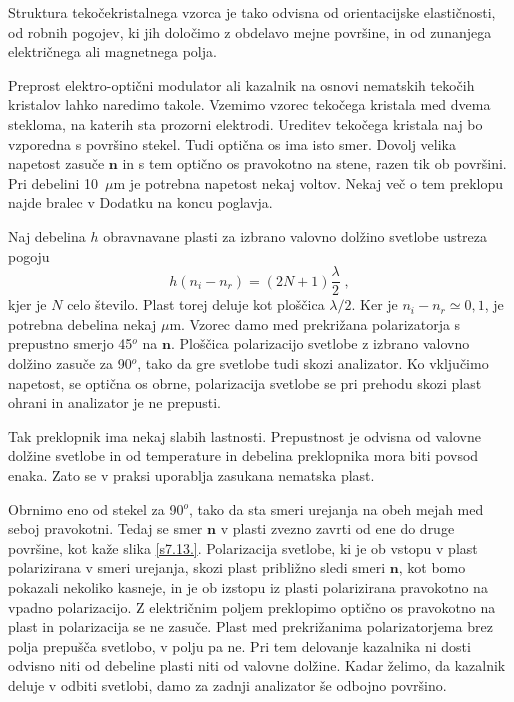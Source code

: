 Struktura tekočekristalnega vzorca je tako odvisna od orientacijske
elastičnosti, od robnih pogojev, ki jih določimo z obdelavo mejne
površine, in od zunanjega električnega ali magnetnega polja.

Preprost elektro-optični modulator ali kazalnik na osnovi nematskih
tekočih kristalov lahko naredimo takole. Vzemimo vzorec tekočega kristala
med dvema stekloma, na katerih sta prozorni elektrodi. Ureditev tekočega
kristala naj bo vzporedna s površino stekel. Tudi optična os ima isto
smer. Dovolj velika napetost zasuče $\mathbf{n}$ in s tem optično os
pravokotno na stene, razen tik ob površini. Pri debelini 10~$\mu$m
je potrebna napetost nekaj voltov. Nekaj več o tem preklopu najde
bralec v Dodatku na koncu poglavja.

Naj debelina $h$ obravnavane plasti za izbrano valovno dolžino svetlobe
ustreza pogoju 
\begin{equation}
h(n_{i}-n_{r})=(2N+1)\frac{\lambda}{2}\;,\label{7.57}
\end{equation}
 kjer je $N$ celo število. Plast torej deluje kot ploščica $\lambda/2$.
Ker je $n_{i}-n_{r}\simeq0,1$, je potrebna debelina nekaj $\mu$m.
Vzorec damo med prekrižana polarizatorja s prepustno smerjo 45$^{o}$
na $\mathbf{n}$. Ploščica polarizacijo svetlobe z izbrano valovno dolžino
zasuče za 90$^{o}$, tako da gre svetlobe tudi skozi analizator. Ko
vključimo napetost, se optična os obrne, polarizacija svetlobe se
pri prehodu skozi plast ohrani in analizator je ne prepusti.

Tak preklopnik ima nekaj slabih lastnosti. Prepustnost je odvisna
od valovne dolžine svetlobe in od temperature in debelina preklopnika
mora biti povsod enaka. Zato se v praksi uporablja zasukana nematska
plast.

Obrnimo eno od stekel za 90$^{o}$, tako da sta smeri urejanja na
obeh mejah med seboj pravokotni. Tedaj se smer $\mathbf{n}$ v plasti
zvezno zavrti od ene do druge površine, kot kaže slika \ref{s7.13.}.
Polarizacija svetlobe, ki je ob vstopu v plast polarizirana v smeri
urejanja, skozi plast približno sledi smeri $\mathbf{n}$, kot bomo pokazali
nekoliko kasneje, in je ob izstopu iz plasti polarizirana pravokotno
na vpadno polarizacijo. Z električnim poljem preklopimo optično os
pravokotno na plast in polarizacija se ne zasuče. Plast med prekrižanima
polarizatorjema brez polja prepušča svetlobo, v polju pa ne. Pri tem
delovanje kazalnika ni dosti odvisno niti od debeline plasti niti
od valovne dolžine. Kadar želimo, da kazalnik deluje v odbiti svetlobi,
damo za zadnji analizator še odbojno površino.

